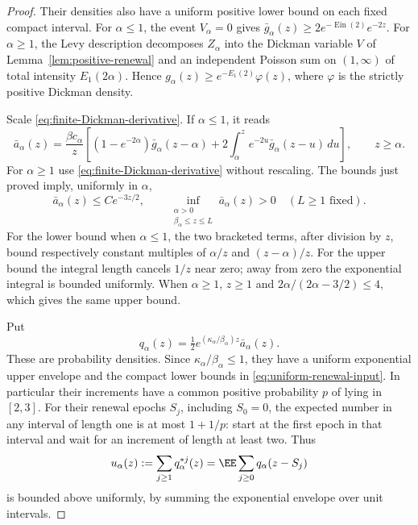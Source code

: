 \documentclass[11pt,letterpaper]{article}
\begin{document}
\begin{proof}
Their densities also have a uniform positive lower bound on each
fixed compact interval. For $\alpha\le1$, the event $V_\alpha=0$
gives
$\bar g_\alpha(z)\ge2e^{-\operatorname{Ein}(2)}e^{-2z}$.
For $\alpha\ge1$, the Levy description decomposes $Z_\alpha$ into
the Dickman variable $V$ of Lemma~\ref{lem:positive-renewal} and an
independent Poisson sum on $(1,\infty)$ of total intensity
$E_1(2\alpha)$. Hence
$g_\alpha(z)\ge e^{-E_1(2)}\varphi(z)$, where $\varphi$ is the
strictly positive Dickman density.

Scale \eqref{eq:finite-Dickman-derivative}. If $\alpha\le1$, it reads
\[
 \bar a_\alpha(z)=\frac{\beta c_\alpha}{z}
 \left[(1-e^{-2\alpha})\bar g_\alpha(z-\alpha)
       +2\int_\alpha^z e^{-2u}\bar g_\alpha(z-u)\,du\right],
 \qquad z\ge\alpha.
\]
For $\alpha\ge1$ use \eqref{eq:finite-Dickman-derivative} without
rescaling. The bounds just proved imply, uniformly in $\alpha$,
\begin{equation}\label{eq:uniform-renewal-input}
 \bar a_\alpha(z)\le C e^{-3z/2},\qquad
 \inf_{\substack{\alpha>0\\\beta_\alpha\le z\le L}}
                       \bar a_\alpha(z)>0\quad(L\ge1\text{ fixed}).
\end{equation}
For the lower bound when $\alpha\le1$, the two bracketed terms,
after division by $z$, bound respectively constant multiples of
$\alpha/z$ and $(z-\alpha)/z$. For the upper bound the integral
length cancels $1/z$ near zero; away from zero the exponential
integral is bounded uniformly. When $\alpha\ge1$, $z\ge1$ and
$2\alpha/(2\alpha-3/2)\le4$, which gives the same upper bound.

Put
\[
 q_\alpha(z)=\tfrac12 e^{(\kappa_\alpha/\beta_\alpha)z}
                                    \bar a_\alpha(z).
\]
These are probability densities. Since
$\kappa_\alpha/\beta_\alpha\le1$, they have a uniform exponential
upper envelope and the compact lower bounds in
\eqref{eq:uniform-renewal-input}. In particular their increments have
a common positive probability $p$ of lying in $[2,3]$.
For their renewal epochs $S_j$, including $S_0=0$, the expected
number in any interval of length one is at most $1+1/p$: start at
the first epoch in that interval and wait for an increment of length
at least two. Thus
\[
 u_\alpha(z):=\sum_{j\ge1}q_\alpha^{*j}(z)
       =\EE\sum_{j\ge0}q_\alpha(z-S_j)
\]
is bounded above uniformly, by summing the exponential envelope over
unit intervals.


\end{proof}
\end{document}
